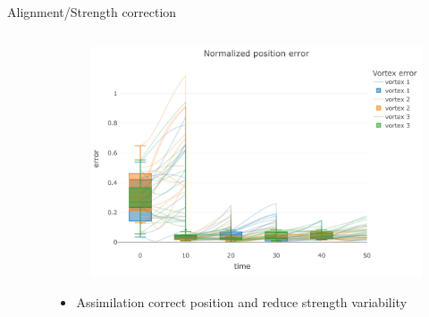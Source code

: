 \documentclass[aspectratio=169]{beamer} %
\begin{document}
\begin{frame}{Alignment/Strength correction}
    \vspace{-0.5cm}
    \begin{columns}
        \begin{column}{0.5\textwidth}
            \begin{figure}
                \centering
            \end{figure}

        \end{column}
        \begin{column}{0.5\textwidth}

            \begin{figure}
                \centering
                \includegraphics[width=\textwidth]{../../conference/images/align_part_error.pdf}
            \end{figure}

            \begin{itemize}
                \item Assimilation correct position and reduce strength variability
            \end{itemize}
        \end{column}
    \end{columns}
\end{frame}
\end{document}
